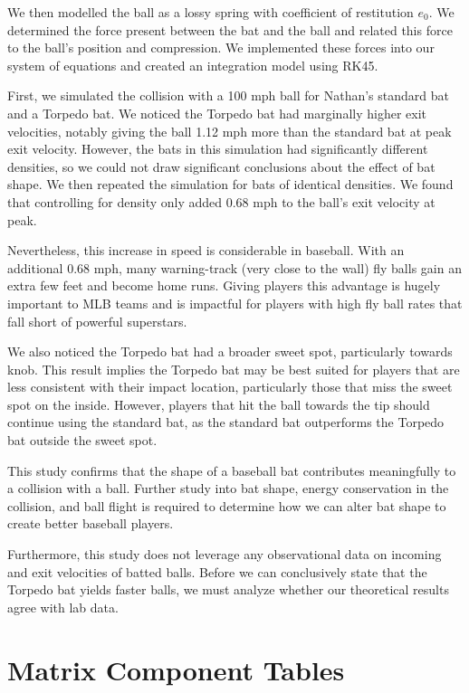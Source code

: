 \documentclass[linenumbers]{aastex7}
\begin{document}
We then modelled the ball as a lossy spring with coefficient of restitution $e_0$. We determined the force present between the bat and the ball and related this force to the ball's position and compression. We implemented these forces into our system of equations and created an integration model using RK45. 

First, we simulated the collision with a 100 mph ball for Nathan's standard bat and a Torpedo bat. We noticed the Torpedo bat had marginally higher exit velocities, notably giving the ball 1.12 mph more than the standard bat at peak exit velocity. However, the bats in this simulation had significantly different densities, so we could not draw significant conclusions about the effect of bat shape. We then repeated the simulation for bats of identical densities. We found that controlling for density only added 0.68 mph to the ball's exit velocity at peak.

Nevertheless, this increase in speed is considerable in baseball. With an additional 0.68 mph, many warning-track (very close to the wall) fly balls gain an extra few feet and become home runs. Giving players this advantage is hugely important to MLB teams and is impactful for players with high fly ball rates that fall short of powerful superstars. 

We also noticed the Torpedo bat had a broader sweet spot, particularly towards knob. This result implies the Torpedo bat may be best suited for players that are less consistent with their impact location, particularly those that miss the sweet spot on the inside. However, players that hit the ball towards the tip should continue using the standard bat, as the standard bat outperforms the Torpedo bat outside the sweet spot.

This study confirms that the shape of a baseball bat contributes meaningfully to a collision with a ball. Further study into bat shape, energy conservation in the collision, and ball flight is required to determine how we can alter bat shape to create better baseball players. 

Furthermore, this study does not leverage any observational data on incoming and exit velocities of batted balls. Before we can conclusively state that the Torpedo bat yields faster balls, we must analyze whether our theoretical results agree with lab data. 


\clearpage
\appendix
\section{Matrix Component Tables}
\end{document}
